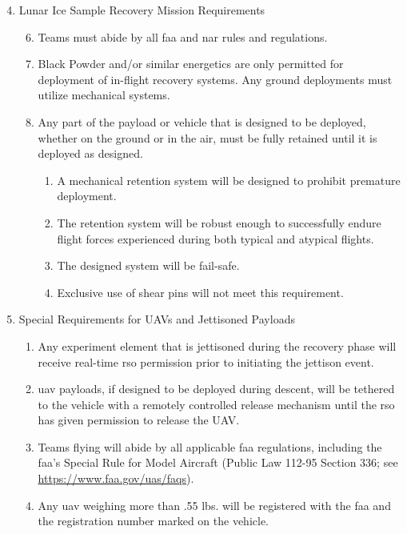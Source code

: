 	\begin{enumerate}[noitemsep, label=4.\arabic*.]
		\setcounter{enumi}{3}
		\item Lunar Ice Sample Recovery Mission Requirements
		\begin{enumerate}[noitemsep, label=4.3.\arabic*.]
			\setcounter{enumi}{5}
			\item Teams must abide by all \gls{faa} and \gls{nar} rules and regulations.
			\item Black Powder and/or similar energetics are only permitted for deployment of in-flight recovery systems. Any ground deployments must utilize mechanical systems.
			\item Any part of the payload or vehicle that is designed to be deployed, whether on the ground or in the air, must be fully retained until it is deployed as designed.
			\begin{enumerate}[noitemsep, label=4.3.7.\arabic*.]
				\item A mechanical retention system will be designed to prohibit premature deployment.
				\item The retention system will be robust enough to successfully endure flight forces experienced during both typical and atypical flights.
				\item The designed system will be fail-safe.
				\item Exclusive use of shear pins will not meet this requirement.
			\end{enumerate}
		\end{enumerate}
		\item Special Requirements for UAVs and Jettisoned Payloads
		\begin{enumerate}[noitemsep, label=4.4.\arabic*.]
			\item Any experiment element that is jettisoned during the recovery phase will receive real-time \gls{rso} permission prior to initiating the jettison event.
			\item \gls{uav} payloads, if designed to be deployed during descent, will be tethered to the vehicle with a remotely controlled release mechanism until the \gls{rso} has given permission to release the UAV.
			\item Teams flying  will abide by all applicable \gls{faa} regulations, including the \gls{faa}'s Special Rule for Model Aircraft (Public Law 112-95 Section 336; see \url{https://www.faa.gov/uas/faqs}).
			\item Any \gls{uav} weighing more than .55 lbs. will be registered with the \gls{faa} and the registration number marked on the vehicle.
		\end{enumerate}
	\end{enumerate}

